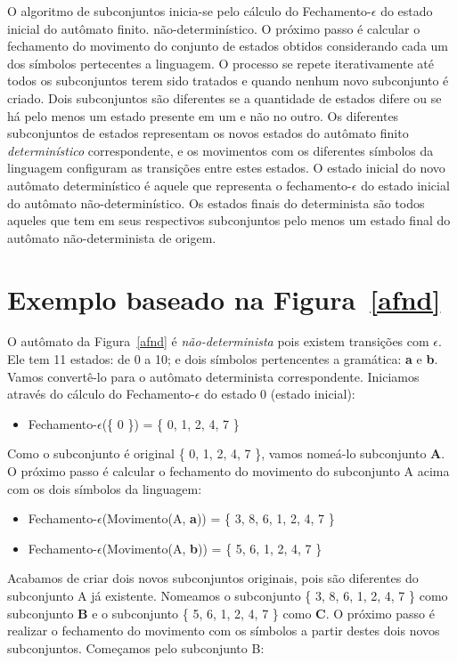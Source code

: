 \documentclass{compiladores}
\newcommand{\vazio}{{\LARGE$\epsilon$}\xspace}
\begin{document}
O algoritmo de subconjuntos inicia-se pelo cálculo do
Fechamento-\vazio do estado inicial do autômato finito.
não-determinístico. O próximo passo é calcular o fechamento do
movimento do conjunto de estados obtidos considerando cada um dos
símbolos pertecentes a linguagem. O processo se repete iterativamente
até todos os subconjuntos terem sido tratados e quando nenhum novo
subconjunto é criado. Dois subconjuntos são diferentes se a quantidade
de estados difere ou se há pelo menos um estado presente em um e não
no outro. Os diferentes subconjuntos de estados representam os novos
estados do autômato finito \emph{determinístico} correspondente, e os
movimentos com os diferentes símbolos da linguagem configuram as
transições entre estes estados. O estado inicial do novo autômato
determinístico é aquele que representa o fechamento-\vazio do estado
inicial do autômato não-determinístico. Os estados finais do
determinista são todos aqueles que tem em seus respectivos
subconjuntos pelo menos um estado final do autômato não-determinista
de origem.

\section{Exemplo baseado na Figura~\ref{afnd}}

O autômato da Figura~\ref{afnd} é \emph{não-determinista} pois existem
transições com \vazio. Ele tem 11 estados: de 0 a 10; e dois símbolos
pertencentes a gramática: {\bf a} e {\bf b}. Vamos convertê-lo para o
autômato determinista correspondente. Iniciamos através do cálculo do Fechamento-\vazio do estado 0 (estado inicial):

\begin{itemize}
\item Fechamento-\vazio(\{ 0 \}) = \{ 0, 1, 2, 4, 7 \}
\end{itemize}

Como o subconjunto é original \{ 0, 1, 2, 4, 7 \}, vamos nomeá-lo
subconjunto {\bf A}. O próximo passo é calcular o fechamento do
movimento do subconjunto A acima com os dois símbolos da linguagem:

\begin{itemize}
\item Fechamento-\vazio(Movimento(A, {\bf a})) = \{ 3, 8, 6, 1, 2, 4, 7 \} 
\item Fechamento-\vazio(Movimento(A, {\bf b})) = \{ 5, 6, 1, 2, 4, 7 \}
\end{itemize}

Acabamos de criar dois novos subconjuntos originais, pois são
diferentes do subconjunto A já existente. Nomeamos o subconjunto \{ 3,
8, 6, 1, 2, 4, 7 \} como subconjunto {\bf B} e o subconjunto \{ 5, 6,
1, 2, 4, 7 \} como {\bf C}. O próximo passo é realizar o fechamento do
movimento com os símbolos a partir destes dois novos
subconjuntos. Começamos pelo subconjunto B:
\end{document}
